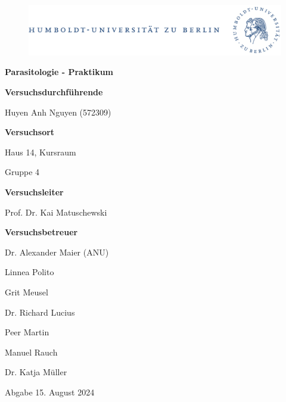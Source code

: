 \documentclass[oneside,10pt,a4paper]{report}
\begin{document}
	
	\begin{titlepage}
		\begin{center}
			\begin{figure}[h!tbp]
				\includegraphics[width=\linewidth]{HUlogo.PNG}
			\end{figure}
			\vspace*{2 cm}
			
			\textcolor{Bluetitle}{\textbf{\huge Parasitologie - Praktikum}}\par
			
			\vspace*{2cm}
			\textcolor{Greyish}{\textbf{Versuchsdurchführende}}\par
			\textcolor{Greyish}{Huyen Anh Nguyen (572309)}\par

			\vspace*{0.5cm}
			\textcolor{Greyish}{\textbf{Versuchsort}}\par
			\textcolor{Greyish}{Haus 14, Kursraum}\par
			\textcolor{Greyish}{Gruppe 4}\par

			
			\vspace*{2 cm}
			\textcolor{Greyish}{\textbf{Versuchsleiter}}\par
			\textcolor{Greyish}{Prof. Dr. Kai Matuschewski}\par
			\textcolor{Greyish}{\textbf{Versuchsbetreuer}}\par
			\textcolor{Greyish}{Dr. Alexander Maier (ANU)}\par
			\textcolor{Greyish}{Linnea Polito}\par
			\textcolor{Greyish}{Grit Meusel}\par
			\textcolor{Greyish}{Dr. Richard Lucius}\par
			\textcolor{Greyish}{Peer Martin}\par
			\textcolor{Greyish}{Manuel Rauch}\par
			\textcolor{Greyish}{Dr. Katja Müller}\par
			
			
			\textcolor{Greyish}{Abgabe 15. August 2024}\par
			
			
			
		\end{center}
	\end{titlepage}
\end{document}
